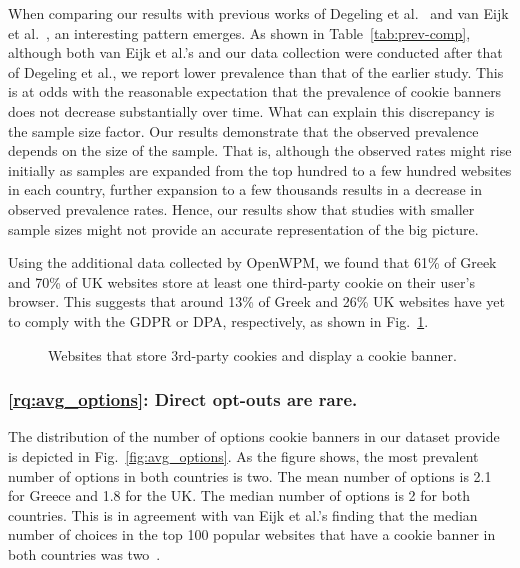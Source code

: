 When comparing our results with previous works of Degeling et al.~\cite{degeling2018we} and van Eijk et al.~\cite{eijk2019impact}, an interesting pattern emerges. As shown in Table~\ref{tab:prev-comp}, although both van Eijk et al.'s and our data collection were conducted after that of Degeling et al., we report lower prevalence than that of the earlier study. This is at odds with the reasonable expectation that the prevalence of cookie banners does not decrease substantially over time. What can explain this discrepancy is the sample size factor. Our results demonstrate that the observed prevalence depends on the size of the sample. That is, although the observed rates might rise initially as samples are expanded from the top hundred to a few hundred websites in each country, further expansion to a few thousands results in a decrease in observed prevalence rates. Hence, our results show that studies with smaller sample sizes might not provide an accurate representation of the big picture. 

Using the additional data collected by OpenWPM, we found that 61\% of Greek and 70\% of UK websites store at least one third-party cookie on their user’s browser. This suggests that around 13\% of Greek and 26\% UK websites have yet to comply with the GDPR or DPA, respectively, as shown in Fig.~\ref{fig:prevalence_cookie_banners_tps}. 


\begin{figure}
    \centering
    \renewcommand{\bcfontstyle}{}
    \begin{bchart}[step=10,max=80, unit=\%]
        \smallskip
    \end{bchart}
    \caption{Websites that store 3rd-party cookies and display a cookie banner.}
    \label{fig:prevalence_cookie_banners_tps}
\end{figure}



\subsubsection{\ref{rq:avg_options}: Direct opt-outs are rare.}
The distribution of the number of options cookie banners in our dataset provide is depicted in Fig.~\ref{fig:avg_options}. 
As the figure shows, the most prevalent number of options in both countries is two. 
The mean number of options is 2.1 for Greece and 1.8 for the UK. 
The median number of options is 2 for both countries. 
This is in agreement with van Eijk et al.'s finding that the median number of choices in the top 100 popular websites that have a cookie banner in both countries was two~\cite{eijk2019impact}. 

